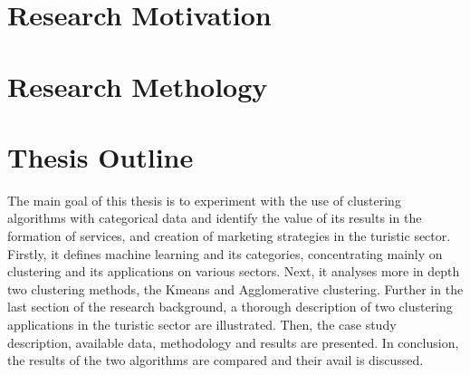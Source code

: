 \section{Research Motivation}
\section{Research Methology}
\section{Thesis Outline}
The main goal of this thesis is to experiment with the use of clustering algorithms with categorical data and identify the value of its results in the formation of services, and creation of marketing strategies in the turistic sector. Firstly, it defines machine learning and its categories, concentrating mainly on clustering and its applications on various sectors. Next, it analyses more in depth two clustering methods, the Kmeans and Agglomerative clustering. Further in the last section of the research background, a thorough description of two clustering applications in the turistic sector are illustrated. Then, the case study description, available data, methodology and results are presented. In conclusion, the results of the two algorithms are compared and their avail is discussed.